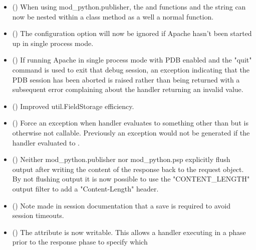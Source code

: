   \begin{itemize}
    \item
      ()
      When using mod_python.publisher, the  and
       functions and the  string
      can now be nested within a class method as a well a normal function.
    \item
      ()
      The  configuration option will now be ignored
      if Apache hasn't been started up in single process mode.
    \item
      ()
      If running Apache in single process mode with PDB enabled and the
      "quit" command is used to exit that debug session, an exception
      indicating that the PDB session has been aborted is raised rather
      than  being returned with a subsequent error complaining
      about the handler returning an invalid value.
    \item
      ()
      Improved util.FieldStorage efficiency.
    \item
      ()
      Force an exception when handler evaluates to something other than
       but is otherwise not callable. Previously an exception
      would not be generated if the handler evaluated to .
    \item
      ()
      Neither mod_python.publisher nor mod_python.psp explicitly flush
      output after writing the content of the response back to the request
      object. By not flushing output it is now possible to use the
      "CONTENT_LENGTH" output filter to add a "Content-Length" header.
    \item
      ()
      Note made in session documentation that a save is required to avoid
      session timeouts.
    \item
      ()
      The  attribute is now writable. This allows a handler
      executing in a phase prior to the response phase to specify which

\end{itemize}
